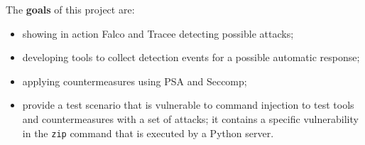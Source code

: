 The \textbf{goals} of this project are:
\begin{itemize}[itemsep=0.1pt, topsep=0pt]
    \item showing in action Falco and Tracee detecting possible attacks;
    \item developing tools to collect detection events for a possible automatic response;
    \item applying countermeasures using PSA and Seccomp;
    \item provide a test scenario that is vulnerable to command injection to test tools and countermeasures with a set of attacks; it contains a specific vulnerability in the \texttt{zip} command that is executed by a Python server.
\end{itemize}

